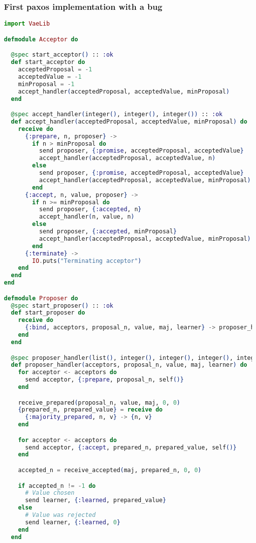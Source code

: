 \subsubsection{First paxos implementation with a bug}
\begin{lstlisting}[language=Elixir, xleftmargin=.1\linewidth]
import VaeLib

defmodule Acceptor do

  @spec start_acceptor() :: :ok
  def start_acceptor do
    acceptedProposal = -1
    acceptedValue = -1
    minProposal = -1
    accept_handler(acceptedProposal, acceptedValue, minProposal)
  end

  @spec accept_handler(integer(), integer(), integer()) :: :ok
  def accept_handler(acceptedProposal, acceptedValue, minProposal) do
    receive do
      {:prepare, n, proposer} ->
        if n > minProposal do
          send proposer, {:promise, acceptedProposal, acceptedValue}
          accept_handler(acceptedProposal, acceptedValue, n)
        else
          send proposer, {:promise, acceptedProposal, acceptedValue}
          accept_handler(acceptedProposal, acceptedValue, minProposal)
        end
      {:accept, n, value, proposer} ->
        if n >= minProposal do
          send proposer, {:accepted, n}
          accept_handler(n, value, n)
        else
          send proposer, {:accepted, minProposal}
          accept_handler(acceptedProposal, acceptedValue, minProposal)
        end
      {:terminate} ->
        IO.puts("Terminating acceptor")
    end
  end
end

defmodule Proposer do
  @spec start_proposer() :: :ok
  def start_proposer do
    receive do
      {:bind, acceptors, proposal_n, value, maj, learner} -> proposer_handler(acceptors, proposal_n, value, maj, learner)
    end
  end

  @spec proposer_handler(list(), integer(), integer(), integer(), integer()) :: :ok
  def proposer_handler(acceptors, proposal_n, value, maj, learner) do
    for acceptor <- acceptors do
      send acceptor, {:prepare, proposal_n, self()}
    end

    receive_prepared(proposal_n, value, maj, 0, 0)
    {prepared_n, prepared_value} = receive do
      {:majority_prepared, n, v} -> {n, v}
    end

    for acceptor <- acceptors do
      send acceptor, {:accept, prepared_n, prepared_value, self()}
    end

    accepted_n = receive_accepted(maj, prepared_n, 0, 0)

    if accepted_n != -1 do
      # Value chosen
      send learner, {:learned, prepared_value}
    else
      # Value was rejected
      send learner, {:learned, 0}
    end
  end


\end{lstlisting}
